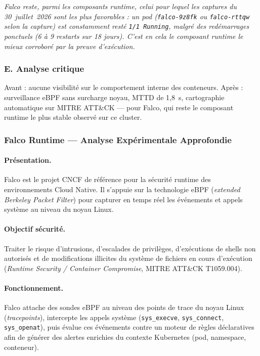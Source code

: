 \textit{Falco reste, parmi les composants runtime, celui pour lequel les captures du 30~juillet~2026 sont les plus favorables : un pod (\texttt{falco-9z8fk} ou \texttt{falco-rttqw} selon la capture) est constamment resté \texttt{1/1 Running}, malgré des redémarrages ponctuels (6 à 9 restarts sur 18 jours). C'est en cela le composant runtime le mieux corroboré par la preuve d'exécution.}

\subsubsection{E. Analyse critique}
Avant : aucune visibilité sur le comportement interne des conteneurs. Après : surveillance eBPF sans surcharge noyau, MTTD de 1,8~s, cartographie automatique sur MITRE ATT\&CK — pour Falco, qui reste le composant runtime le plus stable observé sur ce cluster.

\subsubsection{Falco Runtime — Analyse Expérimentale Approfondie}

\paragraph{Présentation.}
Falco est le projet CNCF de référence pour la sécurité runtime des environnements Cloud Native. Il s'appuie sur la technologie eBPF (\textit{extended Berkeley Packet Filter}) pour capturer en temps réel les événements et appels système au niveau du noyau Linux.

\paragraph{Objectif sécurité.}
Traiter le risque d'intrusions, d'escalades de privilèges, d'exécutions de shells non autorisés et de modifications illicites du système de fichiers en cours d'exécution (\textit{Runtime Security / Container Compromise}, MITRE ATT\&CK T1059.004).

\paragraph{Fonctionnement.}
Falco attache des sondes eBPF au niveau des points de trace du noyau Linux (\textit{tracepoints}), intercepte les appels système (\texttt{sys\_execve}, \texttt{sys\_connect}, \texttt{sys\_openat}), puis évalue ces événements contre un moteur de règles déclaratives afin de générer des alertes enrichies du contexte Kubernetes (pod, namespace, conteneur).

